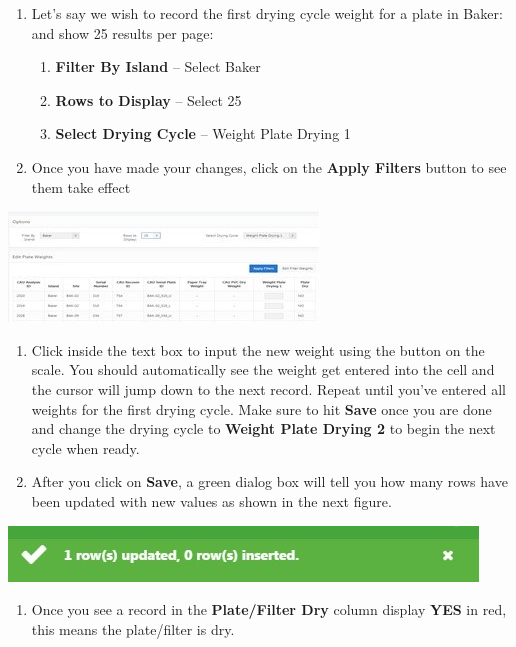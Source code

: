 \documentclass[]{book}
\providecommand{\tightlist}{%
  \setlength{\itemsep}{0pt}\setlength{\parskip}{0pt}}
\begin{document}
\begin{enumerate}
\def\labelenumi{\arabic{enumi}.}
\setcounter{enumi}{2}
\item
  Let's say we wish to record the first drying cycle weight for a plate in Baker: and show 25 results per page:

  \begin{enumerate}
  \def\labelenumii{\alph{enumii}.}
  \tightlist
  \item
    \textbf{Filter By Island} -- Select Baker
  \item
    \textbf{Rows to Display} -- Select 25
  \item
    \textbf{Select Drying Cycle} -- Weight Plate Drying 1
  \end{enumerate}
\item
  Once you have made your changes, click on the \textbf{Apply Filters} button to see them take effect
\end{enumerate}

\includegraphics{images/Data12.jpg}

\begin{enumerate}
\def\labelenumi{\arabic{enumi}.}
\setcounter{enumi}{4}
\item
  Click inside the text box to input the new weight using the button on the scale. You should automatically see the weight get entered into the cell and the cursor will jump down to the next record. Repeat until you've entered all weights for the first drying cycle. Make sure to hit \textbf{Save} once you are done and change the drying cycle to \textbf{Weight Plate Drying 2} to begin the next cycle when ready.
\item
  After you click on \textbf{Save}, a green dialog box will tell you how many rows have been updated with new values as shown in the next figure.
\end{enumerate}

\includegraphics{images/Data13.jpg}

\begin{enumerate}
\def\labelenumi{\arabic{enumi}.}
\setcounter{enumi}{6}
\tightlist
\item
  Once you see a record in the \textbf{Plate/Filter Dry} column display \textbf{YES} in red, this means the plate/filter is dry.
\end{enumerate}
\end{document}
